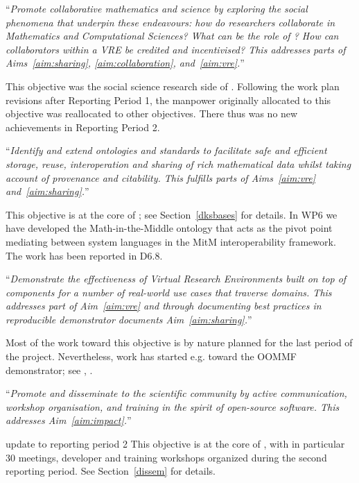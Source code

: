\begin{compactenum}[\bf O1\rm:]
\item \label{objective:social} ``\emph{Promote collaborative mathematics and
  science by exploring the social phenomena that underpin these
  endeavours: how do researchers collaborate in Mathematics and
  Computational Sciences?  What can be the role of \VREs?  How can
  collaborators within a VRE be credited and incentivised? This
  addresses parts of Aims~\ref{aim:sharing}, \ref{aim:collaboration},
  and~\ref{aim:vre}.}''

This objective was the social science research side of
. Following the work plan revisions after
Reporting Period 1, the manpower originally allocated to this
objective was reallocated to other objectives. There thus was no new
achievements in Reporting Period 2.

\item \label{objective:data} ``\emph{Identify and extend ontologies and
  standards to facilitate safe and efficient storage, reuse,
  interoperation and sharing of rich mathematical data whilst taking
  account of provenance and citability. This fulfills parts of
  Aims~\ref{aim:vre} and~\ref{aim:sharing}.}''
 
This objective is at the core of ; see Section~\ref{dksbases} for
details. In WP6 we have developed the Math-in-the-Middle ontology that acts as the pivot
point mediating between system languages in the MitM interoperability framework. The work
has been reported in D6.8.

\item \label{objective:demo} ``\emph{Demonstrate the effectiveness of Virtual
  Research Environments built on top of \ODK components for a
  number of real-world use cases that traverse domains. This addresses
  part of Aim~\ref{aim:vre} and through documenting best practices in
  reproducible demonstrator documents Aim~\ref{aim:sharing}.}''

Most of the work toward this objective is by nature planned for the last period of the \pn
project. Nevertheless, work has started e.g.  toward the OOMMF demonstrator; see
,
.

\item \label{objective:disseminate} ``\emph{Promote and disseminate
  \ODK to the scientific community by active communication,
  workshop organisation, and training in the spirit of open-source
  software. This addresses Aim~\ref{aim:impact}.}''

\begin{oldpart}{update to reporting period 2}
  This objective is at the core of , with in particular
  30 meetings, developer and training workshops organized during the
  second reporting period. See Section~\ref{dissem} for details.
\end{oldpart}
\end{compactenum}

